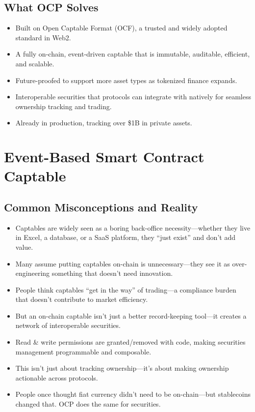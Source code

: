 \documentclass[11pt,a4paper]{article}
\begin{document}
\subsection{What OCP Solves}
\begin{itemize}
    \item Built on Open Captable Format (OCF), a trusted and widely adopted standard in Web2.
    \item A fully on-chain, event-driven captable that is immutable, auditable, efficient, and scalable.
    \item Future-proofed to support more asset types as tokenized finance expands.
    \item Interoperable securities that protocols can integrate with natively for seamless ownership tracking and trading.
    \item Already in production, tracking over \$1B in private assets.
\end{itemize}

\section{Event-Based Smart Contract Captable}
\subsection{Common Misconceptions and Reality}
\begin{itemize}
    \item Captables are widely seen as a boring back-office necessity---whether they live in Excel, a database, or a SaaS platform, they ``just exist'' and don't add value.
    \item Many assume putting captables on-chain is unnecessary---they see it as over-engineering something that doesn't need innovation.
    \item People think captables ``get in the way'' of trading---a compliance burden that doesn't contribute to market efficiency.
    \item But an on-chain captable isn't just a better record-keeping tool---it creates a network of interoperable securities.
    \item Read \& write permissions are granted/removed with code, making securities management programmable and composable.
    \item This isn't just about tracking ownership---it's about making ownership actionable across protocols.
    \item People once thought fiat currency didn't need to be on-chain---but stablecoins changed that. OCP does the same for securities.
\end{itemize}
\end{document}
